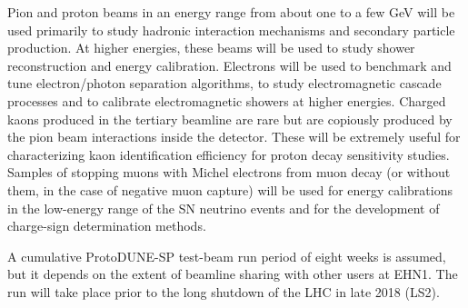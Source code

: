 
Pion and proton beams in an energy range from about one to a few GeV will be used primarily to study hadronic interaction mechanisms and secondary particle production.  At higher energies, these beams will be used to study shower reconstruction and energy calibration. Electrons will be used to benchmark and tune electron/photon separation algorithms, to study electromagnetic cascade processes and to calibrate electromagnetic showers at higher energies. Charged kaons produced in the tertiary beamline are rare but are copiously produced by the pion beam interactions inside the detector. These will be extremely useful for characterizing kaon identification efficiency for proton decay sensitivity studies.  Samples of stopping muons with Michel electrons from muon decay (or without them, in the case of negative muon capture) will be used for energy calibrations in the low-energy range of the SN neutrino events and for the development of charge-sign determination methods. 

A cumulative ProtoDUNE-SP test-beam run period of eight weeks is assumed, but it depends on the extent of beamline sharing with other users at EHN1. The run will take place prior to the long shutdown of the LHC in late 2018 (LS2). 

